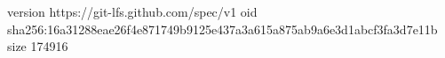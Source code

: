version https://git-lfs.github.com/spec/v1
oid sha256:16a31288eae26f4e871749b9125e437a3a615a875ab9a6e3d1abcf3fa3d7e11b
size 174916
